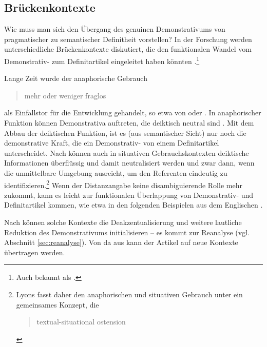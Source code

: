 \subsection{Brückenkontexte} \label{sec:bruecke}

Wie muss man sich den Übergang des genuinen Demonstrativums von pragmatischer zu semantischer Definitheit vorstellen? In der Forschung werden unterschiedliche Brückenkontexte \parencite{Heine2002} diskutiert, die den funktionalen Wandel vom Demonstrativ- zum Definitartikel eingeleitet haben könnten \parencite[zur Übersicht s.][526--528]{deMulder2011}.\footnote{Auch bekannt als  \parencite{Diewald2002}.}

Lange Zeit wurde der anaphorische Gebrauch  \blockcquote[93]{Himmelmann1997}{mehr oder weniger fraglos} als Einfallstor für die Entwicklung gehandelt, so etwa von  \textcite{Oubouzar1989,Oubouzar1992} oder \textcite{Diessel1999}. In anaphorischer Funktion können Demonstrativa auftreten, die deiktisch neutral sind \parencite[41]{Lehmann2015}. Mit dem Abbau der deiktischen Funktion, ist es (aus semantischer Sicht) nur noch die demonstrative Kraft, die ein Demonstrativ- von einem Definitartikel unterscheidet. Nach \textcite[331ff.]{Lyons1999} können auch in situativen Gebrauchskontexten deiktische Informationen überflüssig und damit neutralisiert werden und zwar dann, wenn die unmittelbare Umgebung ausreicht, um den Referenten eindeutig zu identifizieren.\footnote{Lyons fasst daher den anaphorischen und situativen Gebrauch unter ein gemeinsames Konzept, die  \blockcquote[161]{Lyons1999}{textual-situational ostension}.} Wenn der Distanzangabe keine disambiguierende Rolle mehr zukommt, kann es leicht zur funktionalen Überlappung von Demonstrativ- und Definitartikel kommen, wie etwa in den folgenden Beispielen aus dem Englischen \parencite[164]{Lyons1999}. 


 \begin{exe}
	\ex 
	\begin{xlist} \label{ex:lyons}
		\ex \label{ex:lyons-sit}    
		\ex \label{ex:lyons-ana}   
		\end{xlist}
\end{exe}

\noindent
Nach \textcite[332]{Lyons1999} können solche Kontexte die Deakzentualisierung und weitere lautliche Reduktion des Demonstrativums  initialisieren -- es kommt zur Reanalyse (vgl. Abschnitt \ref{sec:reanalyse}). Von da aus kann der Artikel auf neue Kontexte übertragen werden. 

